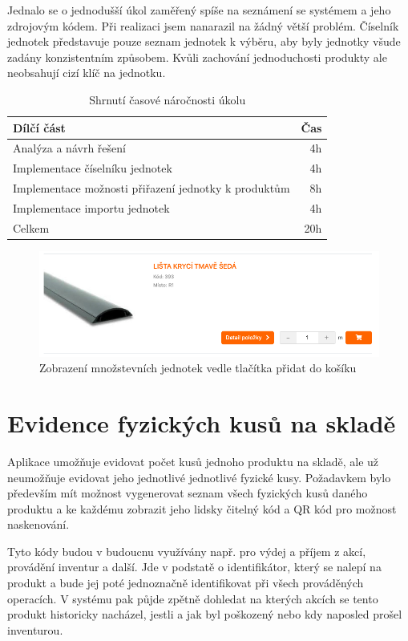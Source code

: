 Jednalo se o jednodušší úkol zaměřený spíše na seznámení se systémem a jeho zdrojovým kódem. Při realizaci jsem nanarazil na žádný větší problém. Číselník jednotek představuje pouze seznam jednotek k výběru, aby byly jednotky všude zadány konzistentním způsobem. Kvůli zachování jednoduchosti produkty ale neobsahují cizí klíč na jednotku.

\begin{table}
	\centering
	\caption[Časová náročnost úkolu na zavedení množstevních jednotek]{Shrnutí časové náročnosti úkolu}
	\label{tab:TopLevelTableLabel}
	{
		\begin{tabular}{lr}
			\toprule
			Dílčí část & Čas\\
			\midrule
			Analýza a návrh řešení & 4h \\
			Implementace číselníku jednotek & 4h \\
			Implementace možnosti přiřazení jednotky k produktům & 8h \\
			Implementace importu jednotek & 4h \\
            \midrule
            Celkem  & 20h \\
			\midrule
		\end{tabular}
	}
\end{table}

\begin{figure}
    \centering
    \includegraphics[width=0.7\linewidth]{Figures/mnozstevni-jednotky.png}
    \caption{Zobrazení množstevních jednotek vedle tlačítka přidat do košíku}
    \label{fig:enter-label}
\end{figure}

\section{Evidence fyzických kusů na skladě}

Aplikace umožňuje evidovat počet kusů jednoho produktu na skladě, ale už neumožňuje evidovat jeho jednotlivé jednotlivé fyzické kusy. Požadavkem bylo především mít možnost vygenerovat seznam všech fyzických kusů daného produktu a ke každému zobrazit jeho lidsky čitelný kód a QR kód pro možnost naskenování.

Tyto kódy budou v budoucnu využívány např. pro výdej a příjem z akcí, provádění inventur a další. Jde v podstatě o identifikátor, který se nalepí na produkt a bude jej poté jednoznačně identifikovat při všech prováděných operacích. V systému pak půjde zpětně dohledat na kterých akcích se tento produkt historicky nacházel, jestli a jak byl poškozený nebo kdy naposled prošel inventurou.

